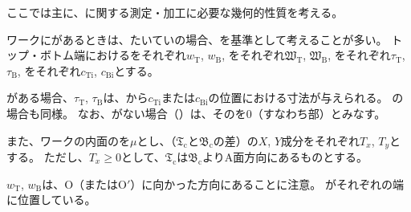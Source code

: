 

ここでは主に、\textbf{\Outcut}に関する測定・加工に必要な幾何的性質を考える。

ワークに\Outcut があるときは、たいていの場合、\textbf{\OutcutAsideThickness}を基準として考えることが多い。
\expandafterindex{\yomiEndFaceID@\nameEndFaceID}トップ・ボトム端における\textbf{\nameInnerDiameter}をそれぞれ$w_\mathrm T$, $w_\mathrm B$, \textbf{\OutcutWidth}をそれぞれ$\mathfrak W_\mathrm T$, $\mathfrak W_\mathrm B$, \OutcutAsideThickness をそれぞれ$\tau_\mathrm T$, $\tau_\mathrm B$, \textbf{\EndFaceInCChamferLength}をそれぞれ$c_\mathrm{Ti}$, $c_\mathrm{Bi}$とする。
\begin{hosoku}
\EndFaceInCChamfer がある場合、\OutcutAsideThickness$\tau_\mathrm T$, $\tau_\mathrm B$は、\EndFace から\EndFaceInCChamferLength$c_\mathrm{Ti}$または$c_\mathrm{Bi}$の位置における寸法が与えられる。
\EndFaceInRChamferRadius の場合も同様。
なお、\EndFaceChamfer がない場合（）は、その\EndFaceChamferLength を0（すなわち\EndFace 部）とみなす。
\end{hosoku}
また、ワークの内面の\textbf{\PlatingThk}を$\mu$とし、\textbf{\CenterlineEndFaceDif}（\TopOutcutCenter$\mathfrak T_\mathrm c$と\BottomOutcutCenter$\mathfrak B_\mathrm c$の差）の$X$, $Y$成分をそれぞれ$T_x$, $T_y$とする。
ただし、$T_x \geq 0$として、\TopOutcutCenter$\mathfrak T_\mathrm c$は\BottomOutcutCenter$\mathfrak B_\mathrm c$よりA面方向にあるものとする。
\begin{hosoku}
\InnerDiameter$w_\mathrm T$, $w_\mathrm B$は、\CurvatureCenter O（またはO$'$）に向かった方向にあることに注意。
\IDCenter がそれぞれの端に位置している。
\end{hosoku}



